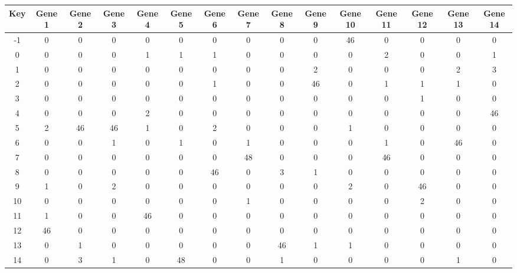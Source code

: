 \begin{tabular}{|c|c|c|c|c|c|c|c|c|c|c|c|c|c|c|}
\hline
Key & Gene 1 & Gene 2 & Gene 3 & Gene 4 & Gene 5 & Gene 6 & Gene 7 & Gene 8 & Gene 9 & Gene 10 & Gene 11 & Gene 12 & Gene 13 & Gene 14 \\
\hline
-1 & 0 & 0 & 0 & 0 & 0 & 0 & 0 & 0 & 0 & 46 & 0 & 0 & 0 & 0 \\
0 & 0 & 0 & 0 & 1 & 1 & 1 & 0 & 0 & 0 & 0 & 2 & 0 & 0 & 1 \\
1 & 0 & 0 & 0 & 0 & 0 & 0 & 0 & 0 & 2 & 0 & 0 & 0 & 2 & 3 \\
2 & 0 & 0 & 0 & 0 & 0 & 1 & 0 & 0 & 46 & 0 & 1 & 1 & 1 & 0 \\
3 & 0 & 0 & 0 & 0 & 0 & 0 & 0 & 0 & 0 & 0 & 0 & 1 & 0 & 0 \\
4 & 0 & 0 & 0 & 2 & 0 & 0 & 0 & 0 & 0 & 0 & 0 & 0 & 0 & 46 \\
5 & 2 & 46 & 46 & 1 & 0 & 2 & 0 & 0 & 0 & 1 & 0 & 0 & 0 & 0 \\
6 & 0 & 0 & 1 & 0 & 1 & 0 & 1 & 0 & 0 & 0 & 1 & 0 & 46 & 0 \\
7 & 0 & 0 & 0 & 0 & 0 & 0 & 48 & 0 & 0 & 0 & 46 & 0 & 0 & 0 \\
8 & 0 & 0 & 0 & 0 & 0 & 46 & 0 & 3 & 1 & 0 & 0 & 0 & 0 & 0 \\
9 & 1 & 0 & 2 & 0 & 0 & 0 & 0 & 0 & 0 & 2 & 0 & 46 & 0 & 0 \\
10 & 0 & 0 & 0 & 0 & 0 & 0 & 1 & 0 & 0 & 0 & 0 & 2 & 0 & 0 \\
11 & 1 & 0 & 0 & 46 & 0 & 0 & 0 & 0 & 0 & 0 & 0 & 0 & 0 & 0 \\
12 & 46 & 0 & 0 & 0 & 0 & 0 & 0 & 0 & 0 & 0 & 0 & 0 & 0 & 0 \\
13 & 0 & 1 & 0 & 0 & 0 & 0 & 0 & 46 & 1 & 1 & 0 & 0 & 0 & 0 \\
14 & 0 & 3 & 1 & 0 & 48 & 0 & 0 & 1 & 0 & 0 & 0 & 0 & 1 & 0 \\
\hline
\end{tabular}